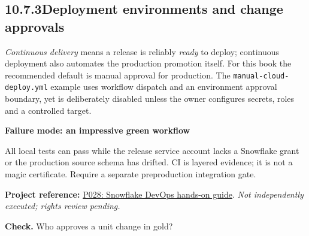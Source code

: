 \documentclass[11pt,twoside]{article}
\newcommand{\topic}[2]{\subsection*{#1\quad #2}}
\newcommand{\repo}[2]{\par\begingroup\fontsize{8.0}{9.6}\selectfont\sffamily\color{inkgray}\textbf{Project reference:} \href{#2}{#1}. \textit{Not independently executed; rights review pending.}\par\endgroup}
\begin{document}
\topic{10.7.3}{Deployment environments and change approvals}
\emph{Continuous delivery} means a release is reliably \emph{ready} to deploy; continuous deployment also automates the production promotion itself. For this book the recommended default is manual approval for production. The \texttt{manual-cloud-deploy.yml} example uses workflow dispatch and an environment approval boundary, yet is deliberately disabled unless the owner configures secrets, roles and a controlled target.
\begin{insight}\textbf{Failure mode: an impressive green workflow}\par
All local tests can pass while the release service account lacks a Snowflake grant or the production source schema has drifted. CI is layered evidence; it is not a magic certificate. Require a separate preproduction integration gate.\end{insight}
\repo{P028: Snowflake DevOps hands-on guide}{https://github.com/Snowflake-Labs/sfguide-getting-started-with-snowflake-devops}
\textbf{Check.} Who approves a unit change in gold?
\newpage
\end{document}
